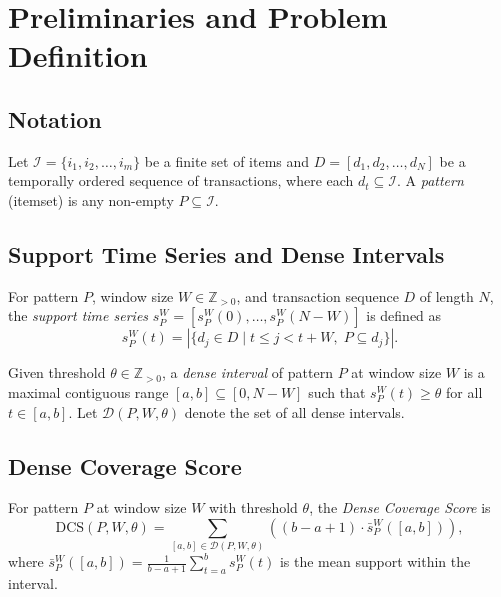 
\section{Preliminaries and Problem Definition}\label{sec:formalization}

\subsection{Notation}

Let $\mathcal{I} = \{i_1, i_2, \ldots, i_m\}$ be a finite set of items and
$D = [d_1, d_2, \ldots, d_N]$ be a temporally ordered sequence of transactions,
where each $d_t \subseteq \mathcal{I}$.
A \emph{pattern} (itemset) is any non-empty $P \subseteq \mathcal{I}$.

\subsection{Support Time Series and Dense Intervals}

\begin{definition}\label{def:support_ts}
For pattern $P$, window size $W \in \mathbb{Z}_{>0}$, and transaction sequence $D$ of length $N$,
the \emph{support time series} $s_P^W = [s_P^W(0), \ldots, s_P^W(N-W)]$ is defined as
\begin{equation}
s_P^W(t) = |\{d_j \in D \mid t \leq j < t+W,\; P \subseteq d_j\}|.
\end{equation}
\end{definition}

\begin{definition}\label{def:dense_interval}
Given threshold $\theta \in \mathbb{Z}_{>0}$, a \emph{dense interval} of pattern $P$ at window size $W$
is a maximal contiguous range $[a, b] \subseteq [0, N-W]$ such that
$s_P^W(t) \geq \theta$ for all $t \in [a, b]$.
Let $\mathcal{D}(P, W, \theta)$ denote the set of all dense intervals.
\end{definition}

\subsection{Dense Coverage Score}

\begin{definition}\label{def:coverage_score}
For pattern $P$ at window size $W$ with threshold $\theta$,
the \emph{Dense Coverage Score} is
\begin{equation}
\mathrm{DCS}(P, W, \theta) = \sum_{[a,b] \in \mathcal{D}(P, W, \theta)}
  \left( (b - a + 1) \cdot \bar{s}_P^W([a,b]) \right),
\end{equation}
where $\bar{s}_P^W([a,b]) = \frac{1}{b-a+1} \sum_{t=a}^{b} s_P^W(t)$
is the mean support within the interval.
\end{definition}

